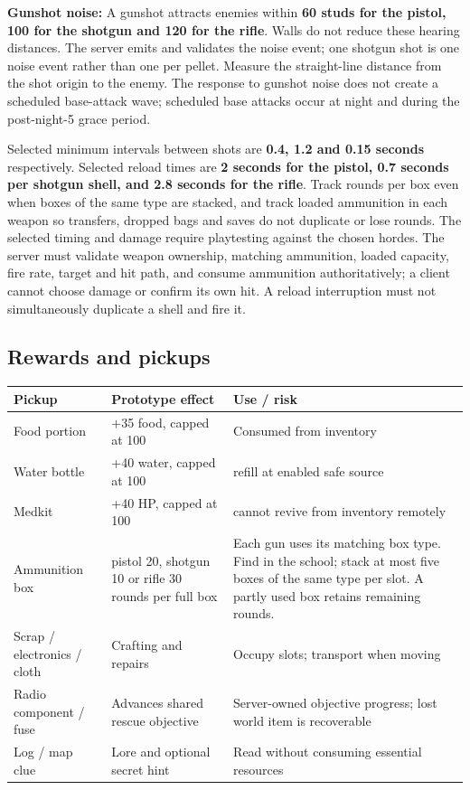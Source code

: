 \textbf{Gunshot noise:} A gunshot attracts enemies within \textbf{60 studs for the pistol, 100 for the shotgun and 120 for the rifle}. Walls do not reduce these hearing distances. The server emits and validates the noise event; one shotgun shot is one noise event rather than one per pellet. Measure the straight-line distance from the shot origin to the enemy. The response to gunshot noise does not create a scheduled base-attack wave; scheduled base attacks occur at night and during the post-night-5 grace period.

Selected minimum intervals between shots are \textbf{0.4, 1.2 and 0.15 seconds} respectively. Selected reload times are \textbf{2 seconds for the pistol, 0.7 seconds per shotgun shell, and 2.8 seconds for the rifle}. Track rounds per box even when boxes of the same type are stacked, and track loaded ammunition in each weapon so transfers, dropped bags and saves do not duplicate or lose rounds. The selected timing and damage require playtesting against the chosen hordes. The server must validate weapon ownership, matching ammunition, loaded capacity, fire rate, target and hit path, and consume ammunition authoritatively; a client cannot choose damage or confirm its own hit. A reload interruption must not simultaneously duplicate a shell and fire it.


\subsection{Rewards and pickups}
\begin{longtable}{@{}p{}p{}p{}@{}}
\toprule
\textbf{Pickup} & \textbf{Prototype effect} & \textbf{Use / risk} \\ \midrule\endhead
Food portion & +35 food, capped at 100 & Consumed from inventory \\
Water bottle & +40 water, capped at 100 & refill at enabled safe source \\
Medkit & +40 HP, capped at 100 & cannot revive from inventory remotely \\
Ammunition box & pistol 20, shotgun 10 or rifle 30 rounds per full box & Each gun uses its matching box type. Find in the school; stack at most five boxes of the same type per slot. A partly used box retains remaining rounds. \\
Scrap / electronics / cloth & Crafting and repairs & Occupy slots; transport when moving \\
Radio component / fuse & Advances shared rescue objective & Server-owned objective progress; lost world item is recoverable \\
Log / map clue & Lore and optional secret hint & Read without consuming essential resources \\
\bottomrule
\end{longtable}

